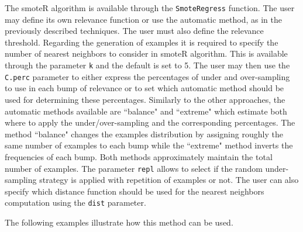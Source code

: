 \documentclass[10pt,a4paper]{article}\usepackage[]{graphicx}\usepackage[]{color}
\begin{document}
The smoteR algorithm is available through the \texttt{SmoteRegress} function. The user may define its own relevance function or use the automatic method, as in the previously described techniques. The user must also define the relevance threshold. 
Regarding the generation of examples it is required to specify the number of nearest neighbors to consider in smoteR algorithm. This is available through the parameter \texttt{k} and the default is set to 5. The user may then use the \texttt{C.perc} parameter to either express the percentages of under and over-sampling to use in each bump of relevance or to set which automatic method should be used for determining these percentages. Similarly to the other approaches, the automatic methods available are ``balance" and ``extreme" which estimate both where to apply the under/over-sampling and the corresponding percentages. The method ``balance" changes the examples distribution by assigning roughly the same number of examples to each bump while the ``extreme" method inverts the frequencies of each bump. Both methods approximately maintain the total number of examples. The parameter \texttt{repl} allows to select if the random under-sampling strategy is applied with repetition of examples or not. The user can also specify which distance function should be used for the nearest neighbors computation using the \texttt{dist} parameter. 

The following examples illustrate how this method can be used.
\end{document}
